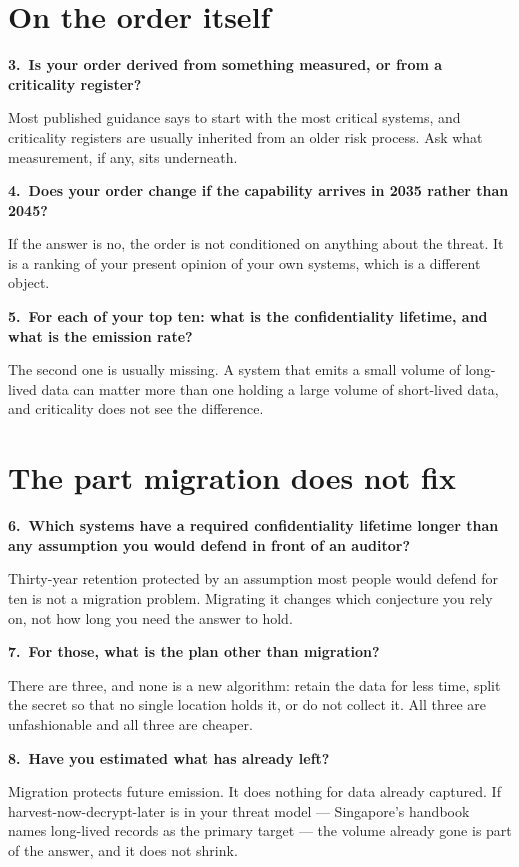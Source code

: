\documentclass[10pt,a4paper]{article}
\newcommand{\ansbox}{\vspace{2pt}\fbox{\parbox[t][22pt][t]{\dimexpr\linewidth-2\fboxsep-2\fboxrule}{%
  \scriptsize\color{gray}answer}}\par\vspace{4pt}}
\begin{document}
\section*{On the order itself}
\textbf{3.\ Is your order derived from something measured, or from a criticality register?}\par
{\small\color{black!70} Most published guidance says to start with the most critical systems, and criticality registers are usually inherited from an older risk process. Ask what measurement, if any, sits underneath.\par}
\ansbox
\textbf{4.\ Does your order change if the capability arrives in 2035 rather than 2045?}\par
{\small\color{black!70} If the answer is no, the order is not conditioned on anything about the threat. It is a ranking of your present opinion of your own systems, which is a different object.\par}
\ansbox
\textbf{5.\ For each of your top ten: what is the confidentiality lifetime, and what is the emission rate?}\par
{\small\color{black!70} The second one is usually missing. A system that emits a small volume of long-lived data can matter more than one holding a large volume of short-lived data, and criticality does not see the difference.\par}
\ansbox
\newpage
\section*{The part migration does not fix}
\textbf{6.\ Which systems have a required confidentiality lifetime longer than any assumption you would defend in front of an auditor?}\par
{\small\color{black!70} Thirty-year retention protected by an assumption most people would defend for ten is not a migration problem. Migrating it changes which conjecture you rely on, not how long you need the answer to hold.\par}
\ansbox
\textbf{7.\ For those, what is the plan other than migration?}\par
{\small\color{black!70} There are three, and none is a new algorithm: retain the data for less time, split the secret so that no single location holds it, or do not collect it. All three are unfashionable and all three are cheaper.\par}
\ansbox
\textbf{8.\ Have you estimated what has already left?}\par
{\small\color{black!70} Migration protects future emission. It does nothing for data already captured. If harvest-now-decrypt-later is in your threat model --- Singapore's handbook names long-lived records as the primary target --- the volume already gone is part of the answer, and it does not shrink.\par}
\ansbox
\end{document}
